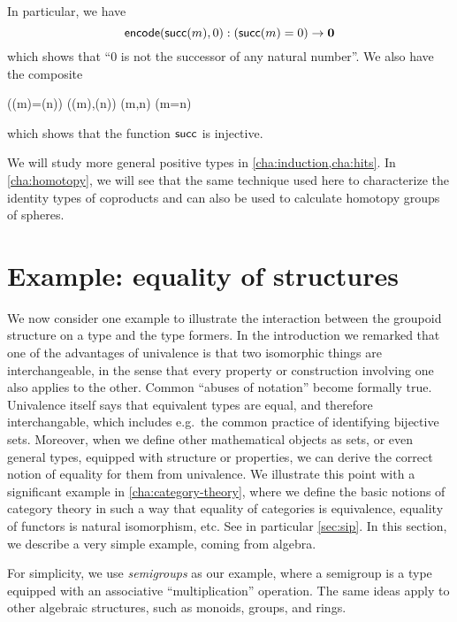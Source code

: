 In particular, we have
\begin{equation}\label{eq:zero-not-succ}
  \encode(\suc(m),0) : (\suc(m)=0) \to \emptyt
\end{equation}
which shows that ``$0$ is not the successor of any natural number''.
We also have the composite
\begin{narrowmultline}\label{eq:suc-injective}
  (\suc(m)=\suc(n))
  \xrightarrow{\encode} \narrowbreak
  \code(\suc(m),\suc(n))
  \jdeq \code(m,n) \xrightarrow{\decode} (m=n)
\end{narrowmultline}
which shows that the function $\mathsf{succ}$ is injective.

We will study more general positive types in \autoref{cha:induction,cha:hits}.
In \autoref{cha:homotopy}, we will see that the same technique used here to characterize the identity types of coproducts and \nat can also be used to calculate homotopy groups of spheres.

\section{Example: equality of structures}

We now consider one example to illustrate the interaction between the groupoid structure on a type and the type
formers.  In the introduction we remarked that one of the
advantages of univalence is that two isomorphic things are interchangeable,
in the sense that every property or construction involving one also
applies to the other.  Common ``abuses of notation'' become formally
true.  Univalence itself says that equivalent types are equal, and
therefore interchangable, which includes e.g.\  the common practice of identifying bijective sets.  Moreover, when we define other
mathematical objects as sets, or even general types, equipped with structure or properties, we
can derive the correct notion of equality for them from univalence.  We illustrate this
point with a significant example in \cref{cha:category-theory}, where we
define the basic notions of category theory in such a way that equality
of categories is equivalence, equality of functors is natural
isomorphism, etc. See in particular \autoref{sec:sip}.
 In this section, we describe a very simple example, coming from algebra.

For simplicity, we use \emph{semigroups} as our example, where a
semigroup is a type equipped with an associative ``multiplication''
operation.  The same ideas apply to other algebraic structures, such as
monoids, groups, and rings.

